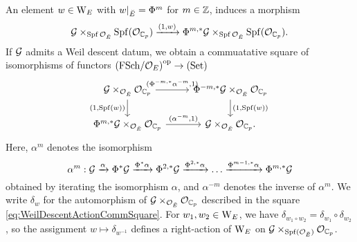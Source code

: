 \documentclass[../main.tex]{subfiles}
\begin{document}
An element $w \in \mathrm W_E$ with $w|_{{\breve {E}}} = \Phi^m$ for $m \in \mathbb{Z}$, induces
a morphism
\begin{equation*}
  \mathcal{G} \times_{\operatorname{Spf}{\mathcal{O}_{{\breve {E}}}}} \operatorname{Spf}(\mathcal{O}_{\mathbb{C}_p}) \xrightarrow{(1,w)}
  \Phi^{m, *}\mathcal{G} \times_{\operatorname{Spf}{\mathcal{O}_{{\breve {E}}}}} \operatorname{Spf}(\mathcal{O}_{\mathbb{C}_p}).
\end{equation*}
If $\mathcal{G}$ admits a Weil descent datum, we obtain a commuatative square 
of isomorphisms of functors ${(\mathrm{FSch}/{\mathcal{O}_E})}^{{\mathrm{op}}} \to {(\mathrm{Set})}$
\begin{equation}\label{eq:WeilDescentActionCommSquare}
\begin{tikzcd}[ampersand replacement=\&]
	{\cG \times_{\cO_\br E} \cO_{\C_p}} \& {\Phi^{-m, *}\cG \times_{\cO_\br E} \cO_{\C_p}} \\
	{\Phi^{m, *}\cG \times_{\cO_\br E} \cO_{\C_p}} \& {\cG \times_{\cO_\br E} \cO_{\C_p}}.
	\arrow["{(\Phi^{-m, *} \alpha^{-m}, 1)}", from=1-1, to=1-2]
	\arrow["{(1, \spf(w))}"', from=1-1, to=2-1]
	\arrow["{(1,\spf(w))}", from=1-2, to=2-2]
	\arrow["{(\alpha^{-m}, 1)}", from=2-1, to=2-2]
\end{tikzcd}
\end{equation}
Here, $\alpha^{m}$ denotes the isomorphism 
$$\alpha^m: \mathcal{G} \xrightarrow{\alpha} \Phi^{*} \mathcal{G} \xrightarrow{\Phi^* \alpha} \Phi^{2, *}\mathcal{G}
\xrightarrow{\Phi^{2,*}\alpha} \dots \xrightarrow{\Phi^{m-1,*}\alpha} \Phi^{m,*}\mathcal{G}$$ 
obtained by iterating the isomorphism $\alpha$, and 
$\alpha^{-m}$ denotes the inverse of $\alpha^{m}$. 
We write $\delta_w$ for the automorphism of $\mathcal{G} \times_{\mathcal{O}_{\breve {E}}} \mathcal{O}_{\mathbb{C}_p}$
described in the square \eqref{eq:WeilDescentActionCommSquare}.
For $w_1, w_2 \in \mathrm W_E$, we have $\delta_{w_1 \circ w_2} = \delta_{w_1}
\circ \delta_{w_2}$,
so the assignment $w \mapsto \delta_{w^{-1}}$ defines a right-action of 
$\mathrm W_E$ on $\mathcal{G} \times_{\operatorname{Spf}(\mathcal{O}_{{\breve {E}}})} \mathcal{O}_{\mathbb{C}_p}$. 
\end{document}
